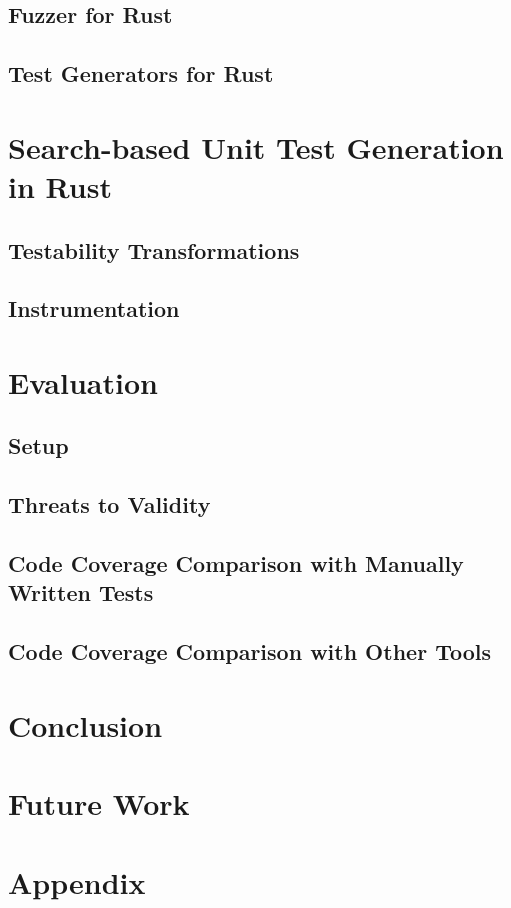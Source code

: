 \documentclass{article}
\begin{document}
\subsection{Fuzzer for Rust}
\subsection{Test Generators for Rust}

\section{Search-based Unit Test Generation in Rust}
\subsection{Testability Transformations}
\subsection{Instrumentation}


\section{Evaluation}
\subsection{Setup}
\subsection{Threats to Validity}
\subsection{Code Coverage Comparison with Manually Written Tests}
\subsection{Code Coverage Comparison with Other Tools}


\section{Conclusion}

\section{Future Work}

\section{Appendix}
\end{document}
